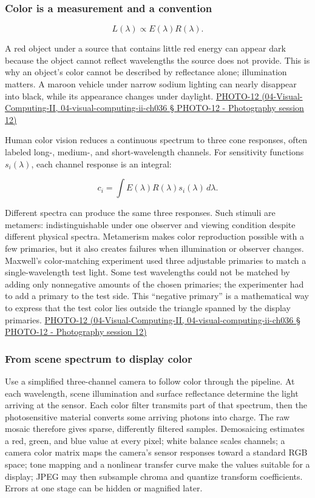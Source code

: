 \subsubsection{Color is a measurement and a convention}\label{color-is-a-measurement-and-a-convention}

\[
L(\lambda)\propto E(\lambda)R(\lambda).
\]

A red object under a source that contains little red energy can appear dark because the object cannot reflect wavelengths the source does not provide. This is why an object's color cannot be described by reflectance alone; illumination matters. A maroon vehicle under narrow sodium lighting can nearly disappear into black, while its appearance changes under daylight. \href{}{PHOTO-12 (04-Visual-Computing-II, 04-visual-computing-ii-ch036 § PHOTO-12 - Photography session 12)}

Human color vision reduces a continuous spectrum to three cone responses, often labeled long-, medium-, and short-wavelength channels. For sensitivity functions \(s_i(\lambda)\), each channel response is an integral:

\[
c_i=\int E(\lambda)R(\lambda)s_i(\lambda)\,d\lambda.
\]

Different spectra can produce the same three responses. Such stimuli are metamers: indistinguishable under one observer and viewing condition despite different physical spectra. Metamerism makes color reproduction possible with a few primaries, but it also creates failures when illumination or observer changes. Maxwell's color-matching experiment used three adjustable primaries to match a single-wavelength test light. Some test wavelengths could not be matched by adding only nonnegative amounts of the chosen primaries; the experimenter had to add a primary to the test side. This ``negative primary'' is a mathematical way to express that the test color lies outside the triangle spanned by the display primaries. \href{}{PHOTO-12 (04-Visual-Computing-II, 04-visual-computing-ii-ch036 § PHOTO-12 - Photography session 12)}

\subsubsection{From scene spectrum to display color}\label{from-scene-spectrum-to-display-color}

Use a simplified three-channel camera to follow color through the pipeline. At each wavelength, scene illumination and surface reflectance determine the light arriving at the sensor. Each color filter transmits part of that spectrum, then the photosensitive material converts some arriving photons into charge. The raw mosaic therefore gives sparse, differently filtered samples. Demosaicing estimates a red, green, and blue value at every pixel; white balance scales channels; a camera color matrix maps the camera's sensor responses toward a standard RGB space; tone mapping and a nonlinear transfer curve make the values suitable for a display; JPEG may then subsample chroma and quantize transform coefficients. Errors at one stage can be hidden or magnified later.

